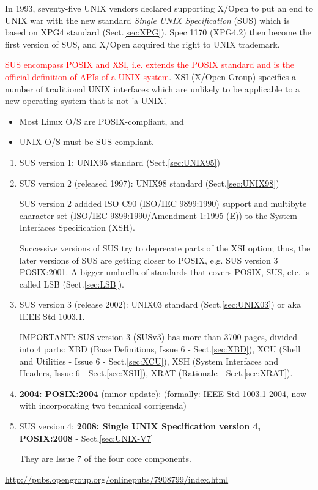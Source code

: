 In 1993, seventy-five UNIX vendors declared supporting X/Open to put an end to
UNIX war with the new standard {\it Single UNIX Specification} (SUS) which is
based on XPG4 standard (Sect.\ref{sec:XPG}). Spec 1170 (XPG4.2) then become the
first version of SUS, and X/Open acquired the right to UNIX trademark.

\textcolor{red}{SUS encompass POSIX and XSI, i.e. extends the POSIX standard and
is the official definition of APIs of a UNIX system}. XSI (X/Open Group)
specifies a number of traditional UNIX interfaces which are unlikely to be
applicable to a new operating system that is not 'a UNIX'. 
\begin{itemize}
  \item Most Linux O/S are POSIX-compliant, and 

  \item UNIX O/S must be SUS-compliant. 
\end{itemize}

\begin{enumerate}
\label{sec:SUS-v1}  
  \item SUS version 1: UNIX95 standard (Sect.\ref{sec:UNIX95})
  
\label{sec:SUS-v3}  
  \item SUS version 2 (released 1997): UNIX98 standard (Sect.\ref{sec:UNIX98})

SUS version 2 addded ISO C90 (ISO/IEC 9899:1990) support and multibyte character
set (ISO/IEC 9899:1990/Amendment 1:1995 (E)) to the System Interfaces
Specification (XSH).

Successive versions of SUS try to deprecate parts of the XSI option; thus, the
later versions of SUS are getting closer to POSIX, e.g.
SUS version 3 == POSIX:2001. A bigger umbrella of standards that covers POSIX,
SUS, etc. is called LSB (Sect.\ref{sec:LSB}).

\label{sec:SUS-v3}
  \item SUS version 3 (release 2002): UNIX03 standard (Sect.\ref{sec:UNIX03}) or
  aka IEEE Std 1003.1.

IMPORTANT: SUS version 3 (SUSv3) has more than 3700 pages, divided into 4 parts:
XBD (Base Definitions, Issue 6 - Sect.\ref{sec:XBD}), XCU (Shell and Utilities -
Issue 6 - Sect.\ref{sec:XCU}), XSH (System Interfaces and Headers, Issue 6 -
Sect.\ref{sec:XSH}), XRAT (Rationale - Sect.\ref{sec:XRAT}).


  \item {\bf 2004: POSIX:2004}  (minor update): (formally: IEEE Std 1003.1-2004,
  now with incorporating two technical corrigenda)
  
\label{sec:SUS-v4}
  \item SUS version 4: {\bf 2008: Single UNIX Specification version 4,
  POSIX:2008} - Sect.\ref{sec:UNIX-V7}
  
  They are Issue 7 of the four core components.
  
  
\end{enumerate}
\url{http://pubs.opengroup.org/onlinepubs/7908799/index.html} 



